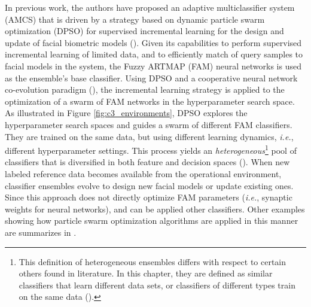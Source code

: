 \begin{figure*}[tb]
  \centering
  \caption{Pattern classification systems may be defined according to two environments.
A \emph{classification environment} that maps a $\mathbb{R}^I$ input feature space to a decision space, respectively defined by feature vectors \textbf{a}, and a set of class labels $C_k$.
As classifier learning dynamics is governed by a vector \textbf{h} of hyperparameters, the latter interacts with an \emph{optimization environment}, where each value of \textbf{h} indicates a position in several search spaces, each one defined by an objective considered during the learning process.
For several objective functions (each corresponding to a search space), solutions (trained FAM networks) can be projected in an objective space}
	\label{fig:c3_environments}
\end{figure*}

In previous work, the authors have proposed an adaptive multiclassifier system (AMCS) that is driven by a strategy based on dynamic particle swarm optimization (DPSO) for supervised incremental learning for the design and update of facial biometric models (\cite{connolly11}).
Given its capabilities to perform supervised incremental learning of limited data, and to efficiently match of query samples to facial models in the system, the Fuzzy ARTMAP (FAM) neural networks is used as the ensemble's base classifier.
Using DPSO and a cooperative neural network co-evolution paradigm (\cite{potter00}), the incremental learning strategy is applied to the optimization of a swarm of FAM networks in the hyperparameter search space.
As illustrated in Figure \ref{fig:c3_environments}, DPSO explores the hyperparameter search spaces and guides a swarm of different FAM classifiers.
They are trained on the same data, but using different learning dynamics, \emph{i.e.}, different hyperparameter settings.
This process yields an \emph{heterogeneous}\footnote{This definition of heterogeneous ensembles differs with respect to certain others found in literature.
In this chapter, they are defined as similar classifiers that learn different data sets, or classifiers of different types train on the same data (\cite{oliveira09, rashid09}).}
 pool of classifiers that is diversified in both feature and decision spaces (\cite{valentini03}).
When new labeled reference data becomes available from the operational environment, classifier ensembles evolve to design new facial models or update existing ones.
Since this approach does not directly optimize FAM parameters (\emph{i.e.}, synaptic weights for neural networks), and can be applied other classifiers.
Other examples showing how particle swarm optimization algorithms are applied in this manner are summarizes in \cite{granger10, kapp10}.

